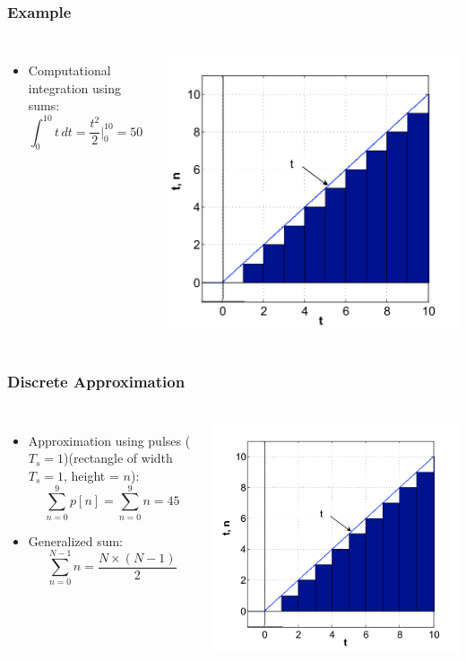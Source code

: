 \documentclass[aspectratio=169,xcolor=dvipsnames,svgnames,x11names,fleqn]{beamer}
\begin{document}
\begin{frame}
\frametitle{Example}
\begin{columns}
    \begin{itemize}
    \item Computational integration using sums:
    $$
    \int_{0}^{10} t \, dt = \frac{t^2}{2} \bigg|_{0}^{10} = 50
    $$
\end{itemize}
\includegraphics[width=0.7\linewidth, trim=0 0 0 0cm,clip]{figures/slopeline.png} 
\end{columns}

\end{frame}

\begin{frame}
\frametitle{Discrete Approximation}
\begin{columns}
\begin{itemize}
    \item Approximation using pulses ($T_s = 1$)(rectangle of width $T_s = 1$, height = $n$):
    $$
    \sum_{n=0}^{9} p[n] = \sum_{n=0}^{9} n = 45
    $$
    \item Generalized sum:
    $$
    \sum_{n=0}^{N-1} n = \frac{N \times (N-1)}{2}
    $$
\end{itemize}
\includegraphics[width=0.7\linewidth, trim=0 0 0 0cm,clip]{figures/slopeline.png} 
\end{columns}


\end{frame}
\end{document}
